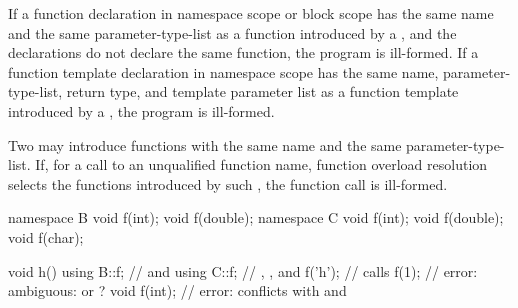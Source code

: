 \pnum
If a function declaration in namespace scope or block scope has the same
name and the same parameter-type-list as
a function introduced by a , and the
declarations do not declare the same function, the program is
ill-formed. If a function template declaration in namespace scope has
the same name, parameter-type-list, return type, and template
parameter list as a function template introduced by a
, the program is ill-formed.
\begin{note}
Two  may introduce functions with the same
name and the same parameter-type-list. If, for a call to an unqualified
function name, function overload resolution selects the functions
introduced by such , the function call is
ill-formed.
\begin{example}

\begin{codeblock}
namespace B {
  void f(int);
  void f(double);
}
namespace C {
  void f(int);
  void f(double);
  void f(char);
}

void h() {
  using B::f;       //  and 
  using C::f;       // , , and 
  f('h');           // calls 
  f(1);             // error: ambiguous:  or ?
  void f(int);      // error:  conflicts with  and 
}
\end{codeblock}
\end{example}
\end{note}

